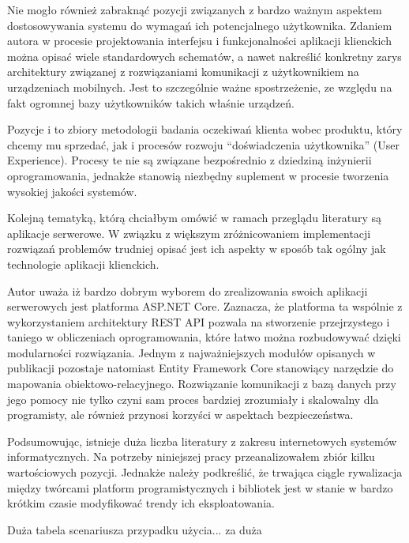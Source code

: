 Nie mogło również zabraknąć pozycji związanych z bardzo ważnym aspektem dostosowywania systemu do wymagań ich potencjalnego użytkownika. Zdaniem autora \cite{Brian2009} w procesie projektowania interfejsu i funkcjonalności aplikacji klienckich można opisać wiele standardowych schematów, a nawet nakreślić konkretny zarys architektury związanej z rozwiązaniami komunikacji z użytkownikiem na urządzeniach mobilnych. Jest to szczególnie ważne spostrzeżenie, ze względu na fakt ogromnej bazy użytkowników takich właśnie urządzeń.

Pozycje \cite{Mike2003} i \cite{Jeff2013} to zbiory metodologii badania oczekiwań klienta wobec produktu, który chcemy mu sprzedać, jak i procesów rozwoju “doświadczenia użytkownika” (User Experience). Procesy te nie są związane bezpośrednio z dziedziną inżynierii oprogramowania, jednakże stanowią niezbędny suplement w procesie tworzenia wysokiej jakości systemów.

Kolejną tematyką, którą chciałbym omówić w ramach przeglądu literatury są aplikacje serwerowe. W związku z większym zróżnicowaniem implementacji rozwiązań problemów trudniej opisać jest ich aspekty w sposób tak ogólny jak technologie aplikacji klienckich. 

Autor \cite{Gaurav2018} uważa iż bardzo dobrym wyborem do zrealizowania swoich aplikacji serwerowych jest platforma ASP.NET Core. Zaznacza, że platforma ta wspólnie z wykorzystaniem architektury REST API \cite{Margaret2020} pozwala na stworzenie przejrzystego i taniego w obliczeniach oprogramowania, które łatwo można rozbudowywać dzięki modularności rozwiązania. Jednym z najważniejszych modułów opisanych w publikacji \cite{Holger2018} pozostaje natomiast Entity Framework Core stanowiący narzędzie do mapowania obiektowo-relacyjnego. Rozwiązanie komunikacji z bazą danych przy jego pomocy nie tylko czyni sam proces bardziej zrozumiały i skalowalny dla programisty, ale również przynosi korzyści w aspektach bezpieczeństwa.

Podsumowując, istnieje duża liczba literatury z zakresu internetowych systemów informatycznych. Na potrzeby niniejszej pracy przeanalizowałem zbiór kilku wartościowych pozycji. Jednakże należy podkreślić, że trwająca ciągle rywalizacja między twórcami platform programistycznych i bibliotek jest w stanie w bardzo krótkim czasie modyfikować trendy ich eksploatowania.

Duża tabela scenariusza przypadku użycia... za duża

